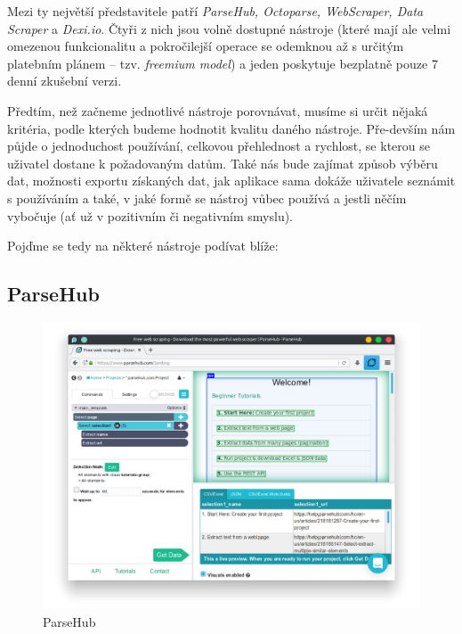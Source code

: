 \documentclass[thesis=B,czech]{FITthesis}[2012/06/26]
\begin{document}
Mezi ty největší představitele patří \emph{ParseHub, Octoparse, WebScraper, Data Scraper} a \emph{Dexi.io}. Čtyři z nich jsou volně dostupné nástroje (které mají ale velmi omezenou funkcionalitu a pokročilejší operace se odemknou až s určitým platebním plánem -- tzv. \emph{freemium model}) a jeden poskytuje bezplatně pouze 7 denní zkušební verzi.

Předtím, než začneme jednotlivé nástroje porovnávat, musíme si určit nějaká kritéria, podle kterých budeme hodnotit kvalitu daného nástroje. Pře-devším nám půjde o jednoduchost používání, celkovou přehlednost a rychlost, se kterou se uživatel dostane k požadovaným datům. Také nás bude zajímat způsob výběru dat, možnosti exportu získaných dat, jak aplikace sama dokáže uživatele seznámit s používáním a také, v jaké formě se nástroj vůbec používá a jestli něčím vybočuje (a\v{t} už v pozitivním či negativním smyslu). 

Poj\v{d}me se tedy na některé nástroje podívat blíže:

\subsection{ParseHub}
\begin{figure}[h]
	\includegraphics[width=\linewidth]{images/ParseHub.png}
	\caption{ParseHub}
	\label{fig:parseHub}
\end{figure}
\end{document}
